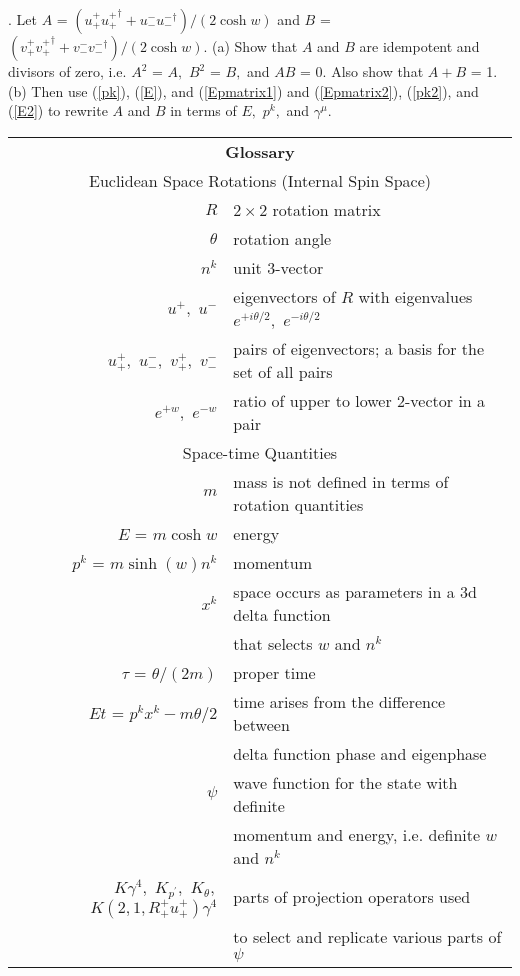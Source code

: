 \documentclass[a4paper,12pt]{article}
\begin{document}
\vspace{0.3cm}
. Let $A$ = $(u_{+}^{+ } {u_{+}^{+  }}^{\dagger} + u_{-}^{- } {u_{-}^{- }}^{\dagger})/(2 \cosh{w})$ and $B$ = $(v_{+}^{+ } {v_{+}^{+  }}^{\dagger} + v_{-}^{- } {v_{-}^{- }}^{\dagger})/(2 \cosh{w}).$ (a) Show that $A$ and $B$ are idempotent and divisors of zero, i.e. $A^2$ = $A,$ $B^2$ = $B,$ and $AB$ = 0. Also show that $A + B$ = 1. (b) Then use   (\ref{pk}), (\ref{E}), and (\ref{Epmatrix1}) and (\ref{Epmatrix2}), (\ref{pk2}), and (\ref{E2}) to rewrite $A$ and $B$ in terms of $E,$ $p^{k},$ and $\gamma^{\mu}.$

\begin{tabular}{rl}
\multicolumn{2}{c}{\rule[-3mm]{0mm}{8mm}\bfseries Glossary}\\
\multicolumn{2}{c}{\rule[-3mm]{0mm}{8mm}Euclidean Space Rotations (Internal Spin Space)}\\
$R$ & $2 \times 2$ rotation matrix  \\
$\theta$ & rotation angle  \\
$n^{k}$ & unit 3-vector \\
$u^{+},$ $u^{-}$ & eigenvectors of $R$ with eigenvalues $e^{+i \theta/2},$ $e^{-i \theta/2}$ \\
$u_{+}^{+},$ $u_{-}^{-},$ $v_{+}^{+},$ $v_{-}^{-}$ & pairs of eigenvectors; a basis for the set of all pairs  \\
$e^{+w},$ $e^{-w}$ & ratio of upper to lower 2-vector in a pair \\ 
\multicolumn{2}{c}{\rule[-3mm]{0mm}{8mm}Space-time Quantities}\\
$m$ & mass is not defined in terms of rotation quantities \\
$E$ = $m \cosh{w}$ & energy  \\
$p^{k}$ = $ m \sinh{(w)} n^{k}$ & momentum \\
$x^{k}$ & space occurs as parameters in a 3d delta function \\
 & that selects $w$ and $n^{k}$ \\
$\tau$ = $\theta/(2m)$ & proper time  \\
$Et$ = $ p^{k}x^{k} - m\theta/2$ & time arises from the difference between \\
 & delta function phase and eigenphase \\
$\psi$ & wave function for the state with definite \\
	& momentum and energy, i.e. definite $w$ and $n^{k}$  \\
$K \gamma^{4},$ $K_{p^{\prime}},$ $K_{\theta},$ $K(2,1,R_{+}^{+} u_{+}^{+}) \gamma^{4}$ & parts of projection operators used \\ 
 & to select and replicate various parts of $\psi$ 
\end{tabular}
\end{document}
